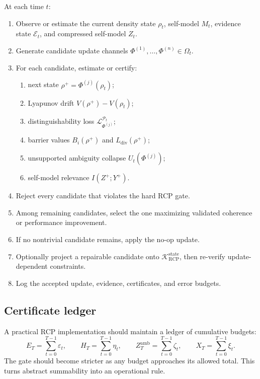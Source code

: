 \documentclass[11pt]{article}
\newcommand{\K}{\mathcal{K}}
\newcommand{\Pcal}{\mathcal{P}}
\newcommand{\Ecal}{\mathcal{E}}
\newcommand{\Lcal}{\mathcal{L}}
\newcommand{\1}{\mathbf{1}}
\newcommand{\eps}{\varepsilon}
\newcommand{\RCP}{\mathrm{RCP}}
\newcommand{\diver}{\mathrm{div}}
\newcommand{\state}{\mathrm{state}}
\newcommand{\amb}{\mathrm{amb}}
\begin{document}
At each time \(t\):
\begin{enumerate}
    \item Observe or estimate the current density state \(\rho_t\), self-model \(M_t\), evidence state \(\Ecal_t\), and compressed self-model \(Z_t\).
    \item Generate candidate update channels \(\Phi^{(1)},\dots,\Phi^{(n)}\in\Omega_t\).
    \item For each candidate, estimate or certify:
    \begin{enumerate}[label=(\alph*)]
        \item next state \(\rho^+=\Phi^{(j)}(\rho_t)\);
        \item Lyapunov drift \(V(\rho^+)-V(\rho_t)\);
        \item distinguishability loss \(\Lcal_{\Phi^{(j)}}^{\Pcal_t}\);
        \item barrier values \(B_i(\rho^+)\) and \(L_{\diver}(\rho^+)\);
        \item unsupported ambiguity collapse \(U_t(\Phi^{(j)})\);
        \item self-model relevance \(I(Z^+;Y^+)\).
    \end{enumerate}
    \item Reject every candidate that violates the hard RCP gate.
    \item Among remaining candidates, select the one maximizing validated coherence or performance improvement.
    \item If no nontrivial candidate remains, apply the no-op update.
    \item Optionally project a repairable candidate onto \(\K_{\RCP}^{\state}\), then re-verify update-dependent constraints.
    \item Log the accepted update, evidence, certificates, and error budgets.
\end{enumerate}

\subsection{Certificate ledger}

A practical RCP implementation should maintain a ledger of cumulative budgets:
\[
E_T=\sum_{t=0}^{T-1}\eps_t,
\qquad
H_T=\sum_{t=0}^{T-1}\eta_t,
\qquad
Z_T^{\amb}=\sum_{t=0}^{T-1}\zeta_t,
\qquad
X_T=\sum_{t=0}^{T-1}\xi_t.
\]
The gate should become stricter as any budget approaches its allowed total. This turns abstract summability into an operational rule.
\end{document}

